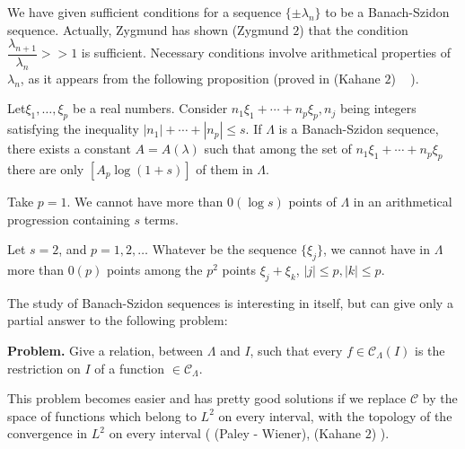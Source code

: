 We have given sufficient conditions for a sequence $\{\pm \lambda_n\}$
to be a Banach-Szidon sequence. Actually, Zygmund has shown (Zygmund
$2$) that the condition $\dfrac{\lambda_{n+1}}{\lambda_n} > > 1$ is
sufficient. Necessary conditions involve arithmetical properties of
$\lambda_n$, as it appears from the following proposition (proved in
(Kahane $2$) ~ ). 

Let\pageoriginale $\xi_1, \ldots, \xi_p$ be a real numbers. Consider $n_1 \xi_1 +
\cdots + n_p \xi_p, n_j$ being integers satisfying the inequality $|
n_1 | + \cdots + |n_p | \le s$. If $\Lambda$ is a Banach-Szidon
sequence, there exists a constant $A = A(\lambda)$ such that among the
set of $n_1 \xi_1 + \cdots + n_p \xi_p$ there are only $[A_p \log
 (1+s)]$ of them in $\Lambda$. 

\begin{examples*}
 Take $p = 1$. We cannot have more than $0 (\log s)$ points of
 $\Lambda$ in an arithmetical progression containing $s$ terms. 
\end{examples*}

Let $s = 2$, and $p = 1, 2, \ldots$ Whatever be the sequence $\{
\xi_j\}$, we cannot have in $\Lambda$ more than $0(p)$ points among the
$p^2$ points $\xi_j + \xi_k$, $| j | \le p, | k | \le p$. 

The study of Banach-Szidon sequences is interesting in itself, but can
give only a partial answer to the following problem: 

\noindent
\textbf{Problem.} Give a relation, between $\Lambda$ and $I$, such
that every $f \in \mathscr{C}_\Lambda (I)$ is the restriction on $I$
of a function $\in \mathscr{C}_\Lambda$. 

This problem becomes easier and has pretty good solutions if we
replace $\mathscr{C}$ by the space of functions which belong to $L^2$
on every interval, with the topology of the convergence in $L^2$ on
every interval ( (Paley - Wiener), (Kahane $2$) ). 
